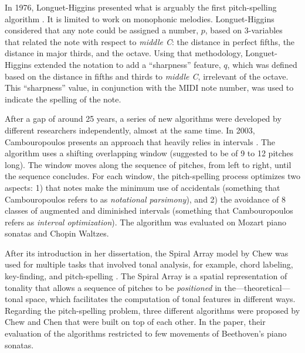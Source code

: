 

In 1976, Longuet-Higgins presented what is arguably the
first pitch-spelling algorithm
\parencite{longuethiggins1976perception}. It is limited to
work on monophonic melodies. Longuet-Higgins considered that
any note could be assigned a number, $p$, based on
3-variables that related the note with respect to
\emph{middle C}: the distance in perfect fifths, the
distance in major thirds, and the octave. Using that
methodology, Longuet-Higgins extended the notation to add a
``sharpness'' feature, $q$, which was defined based on the
distance in fifths and thirds to \emph{middle C}, irrelevant
of the octave. This ``sharpness'' value, in conjunction with
the MIDI note number, was used to indicate the spelling of
the note.

After a gap of around 25 years, a series of new algorithms
were developed by different researchers independently,
almost at the same time. In 2003, Cambouropoulos presents an
approach that heavily relies in intervals
\parencite{cambouropoulos2003pitch}. The algorithm uses a
shifting overlapping window (suggested to be of 9 to 12
pitches long). The window moves along the sequence of
pitches, from left to right, until the sequence concludes.
For each window, the pitch-spelling process optimizes two
aspects: 1) that notes make the minimum use of accidentals
(something that Cambouropoulos refers to as \emph{notational
parsimony}), and 2) the avoidance of 8 classes of augmented
and diminished intervals (something that Cambouropoulos
refers as \emph{interval optimization}). The algorithm was
evaluated on Mozart piano sonatas and Chopin Waltzes.

After its introduction in her dissertation, the Spiral Array
model by Chew was used for multiple tasks that involved
tonal analysis, for example, chord labeling, key-finding,
and pitch-spelling \parencite{chew2000towards}. The Spiral
Array is a spatial representation of tonality that allows a
sequence of pitches to be \emph{positioned} in
the---theoretical---tonal space, which facilitates the
computation of tonal features in different ways. Regarding
the pitch-spelling problem, three different algorithms were
proposed by Chew and Chen \parencite{chew2003determining}
that were built on top of each other. In the paper, their
evaluation of the algorithms restricted to few movements of
Beethoven's piano sonatas.

